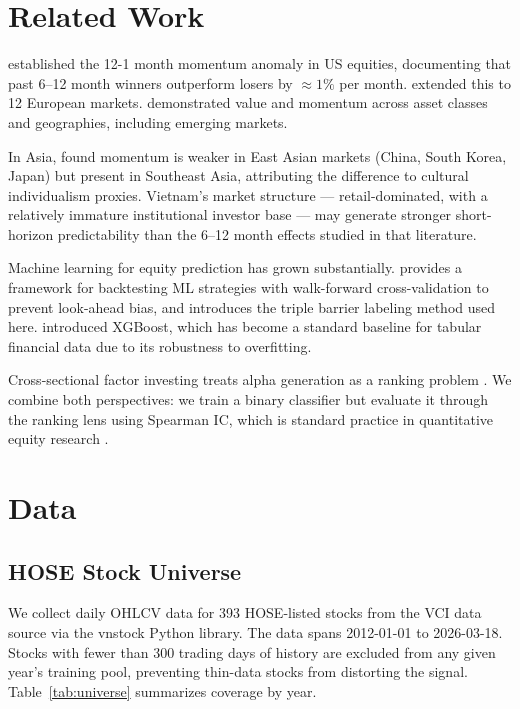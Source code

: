 \documentclass[12pt,a4paper]{article}
\begin{document}
\section{Related Work}
\label{sec:related}

\citet{jegadeesh1993returns} established the 12-1 month momentum anomaly in US
equities, documenting that past 6--12 month winners outperform losers by
$\approx 1\%$ per month. \citet{rouwenhorst1998international} extended this to 12
European markets. \citet{asness2014value} demonstrated value and momentum across
asset classes and geographies, including emerging markets.

In Asia, \citet{chui2010individualism} found momentum is weaker in East Asian markets
(China, South Korea, Japan) but present in Southeast Asia, attributing the difference
to cultural individualism proxies. Vietnam's market structure --- retail-dominated,
with a relatively immature institutional investor base --- may generate stronger
short-horizon predictability than the 6--12 month effects studied in that literature.

Machine learning for equity prediction has grown substantially.
\citet{lopez2018advances} provides a framework for backtesting ML strategies with
walk-forward cross-validation to prevent look-ahead bias, and introduces the
triple barrier labeling method used here.
\citet{chen2016xgboost} introduced XGBoost, which has become a standard baseline
for tabular financial data due to its robustness to overfitting.

Cross-sectional factor investing treats alpha generation as a ranking problem
\citep{asness2013devil}. We combine both perspectives: we train a binary classifier
but evaluate it through the ranking lens using Spearman IC, which is standard
practice in quantitative equity research \citep{lopez2018advances}.

\section{Data}
\label{sec:data}

\subsection{HOSE Stock Universe}

We collect daily OHLCV data for 393 HOSE-listed stocks from the VCI data source
via the vnstock Python library. The data spans 2012-01-01 to 2026-03-18.
Stocks with fewer than 300 trading days of history are excluded from any given
year's training pool, preventing thin-data stocks from distorting the signal.
Table~\ref{tab:universe} summarizes coverage by year.
\end{document}
